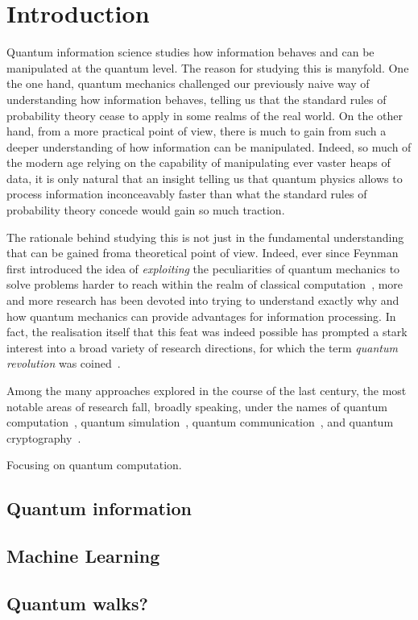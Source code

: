 \chapter{Introduction}

Quantum information science studies how information behaves and can be manipulated at the quantum level.
The reason for studying this is manyfold. One the one hand, quantum mechanics challenged our previously naive way of understanding how information behaves, telling us that the standard rules of probability theory cease to apply in some realms of the real world.
On the other hand, from a more practical point of view, there is much to gain from such a deeper understanding of how information can be manipulated. Indeed, so much of the modern age relying on the capability of manipulating ever vaster heaps of data, it is only natural that an insight telling us that quantum physics allows to process information inconceavably faster than what the standard rules of probability theory concede would gain so much traction.

The rationale behind studying this is not just in the fundamental understanding that can be gained froma theoretical point of view. Indeed, ever since Feynman first introduced the idea of \emph{exploiting} the peculiarities of quantum mechanics to solve problems harder to reach within the realm of classical computation~\cite{feynman1982simulating}, more and more research has been devoted into trying to understand exactly why and how quantum mechanics can provide advantages for information processing.
In fact, the realisation itself that this feat was indeed possible has prompted a stark interest into a broad variety of research directions, for which the term \emph{quantum revolution} was coined~\cite{dowling2003quantum}.

Among the many approaches explored in the course of the last century, the most notable areas of research fall, broadly speaking, under the names of quantum computation~\cite{shor1997polynomial}, quantum simulation~\cite{lloyd1996universal}, quantum communication~\cite{bennett1993teleporting}, and quantum cryptography~\cite{bennett2014quantum}.

Focusing on quantum computation.


\section{Quantum information}

\section{Machine Learning}

\section{Quantum walks?}

